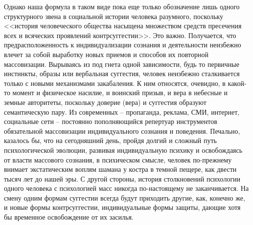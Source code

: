 Однако наша формула в таком виде пока еще только обозначение лишь одного
структурного звена в социальной истории человека разумного, поскольку
<<история человеческого общества насыщена множеством средств пресечения всех и
всяческих проявлений контрсуггестии>>\autocite{porshnev1974}. Это важно.
Получается, что предрасположенность к индивидуализации сознания и деятельности
неизбежно влечет за собой выработку новых приемов и способов их повторной
массовизации. Вырываясь из под гнета одной зависимости, будь то первичные
инстинкты, образы или вербальная суггестия, человек неизбежно сталкивается
только с новыми механизмами закабаления. К ним относятся, очевидно, в какой-то
момент и физическое насилие, и воинский призыв, и вера в небесные и земные
авторитеты, поскольку доверие (вера) и суггестия образуют семантическую пару.
Из современных -- пропаганда, реклама, СМИ, интернет, социальные сети -- постоянно
пополняющийся репертуар инструментов обязательной массовизации индивидуального
сознания и поведения. Печально, казалось бы, что на сегодняшний день, пройдя
долгий и сложный путь психологической эволюции, развивая индивидуальную психику
и освобождаясь от власти массового сознания, в психическом смысле, человек
по-прежнему внимает экстатическим воплям шамана у костра в темной пещере,
как двести тысяч лет до нашей эры. С другой стороны, история столкновений
психологии одного человека с психологией масс никогда по-настоящему не
заканчивается. На смену одним формам суггестии всегда будут приходить другие,
как, конечно же, и новые формы контрсуггестии, индивидуальные формы защиты,
дающие хотя бы временное освобождение от их засилья.

